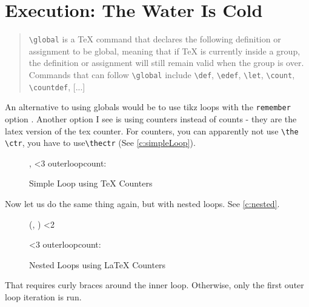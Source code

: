 \documentclass{article} \usepackage[utf8]{inputenc}
\begin{document}
\section{ Execution: The Water Is Cold}
\begin{myquote}\begin{quote}
\texttt{\textbackslash global} is a TeX command that declares the following definition or assignment to be global, meaning that if TeX is currently inside a group, the definition or assignment will still remain valid when the group is over. Commands that can follow \texttt{\textbackslash global} include \texttt{\textbackslash def}, \texttt{\textbackslash edef}, \texttt{\textbackslash let}, \texttt{\textbackslash count}, \texttt{\textbackslash countdef}, [...]\\
\end{quote}\end{myquote}
An alternative to using globals would be to use tikz loops with the \texttt{remember} option . Another option I see is using counters instead of counts - they are the latex version of the tex counter. For counters, you can apparently not use \texttt{\textbackslash the \textbackslash ctr}, you have to use\texttt{\textbackslash thectr} (See \autoref{c:simpleLoop}).
\begin{figure}
\begin{mycode}
\setcounter{outerloopcounter}{0}
\loop
    	\addtocounter{outerloopcounter}{1}
           \theouterloopcounter ,
           \ifnum \value{outerloopcounter}<3
\repeat
outerloopcount: \theouterloopcounter
\end{mycode}
\caption{Simple Loop using TeX Counters}
\label{c:simpleLoop}
\end{figure}

Now let us do the same thing again, but with nested loops. See \autoref{c:nested}.
\begin{figure}[htbp]
\begin{mycode}
\setcounter{outerloopcounter}{0}
\loop
	\setcounter{innerloopcounter}{0}
    	\addtocounter{outerloopcounter}{1}
	
	{\loop
	\addtocounter{innerloopcounter}{1}
           (\theouterloopcounter , \theinnerloopcounter )
	\ifnum \value{innerloopcounter}<2
           \repeat }

           \ifnum \value{outerloopcounter}<3
\repeat
outerloopcount: \theouterloopcounter
\end{mycode}
\caption{Nested Loops using LaTeX Counters}
\label{c:nested}
\end{figure}
That requires curly braces around the inner loop. Otherwise, only the first outer loop iteration is run.
\end{document}
